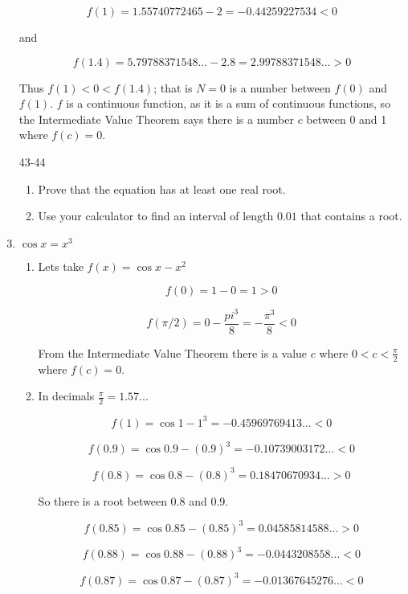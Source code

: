 \documentclass{article}
\begin{document}
\begin{enumerate}
				$$f(1) = 1.55740772465 - 2 = -0.44259227534 < 0$$

				and

				$$f(1.4) = 5.79788371548... - 2.8 = 2.99788371548... > 0$$

				Thus $f(1) < 0 < f(1.4)$; that is $N = 0$ is a number between $f(0)$ and
				$f(1)$. $f$ is a continuous function, as it is a sum of continuous functions,
				so the Intermediate Value Theorem says there is a number $c$ between 0 and
				1 where $f(c) = 0$.

			\item[43-44]

			\begin{enumerate}
				\item Prove that the equation has at least one real root.

				\item Use your calculator to find an interval of length $0.01$ that
					contains a root.
			\end{enumerate}

			\item $\cos x = x^3$

			\begin{enumerate}

				\item

				Lets take $f(x) = \cos x - x^2$

				$$f(0) = 1 - 0 = 1 > 0$$

				$$f(\pi/2) = 0 - \frac{pi^3}{8} = -\frac{\pi^3}{8} < 0$$

				From the Intermediate Value Theorem there is a value $c$
				where $0 < c < \frac{\pi}{2}$ where $f(c) = 0$.

				\item

				In decimals $\frac{\pi}{2} = 1.57...$

				$$f(1) = \cos 1 - 1^3 = -0.45969769413... < 0$$

				$$f(0.9) = \cos 0.9 - (0.9)^3 = -0.10739003172... < 0$$

				$$f(0.8) = \cos 0.8 - (0.8)^3 = 0.18470670934... >0$$

				So there is a root between 0.8 and 0.9.

				$$f(0.85) = \cos 0.85 - (0.85)^3 = 0.04585814588... > 0$$

				$$f(0.88) = \cos 0.88 - (0.88)^3 = -0.0443208558... < 0$$

				$$f(0.87) = \cos 0.87 - (0.87)^3 = -0.01367645276... < 0$$


\end{enumerate}
\end{enumerate}
\end{document}
